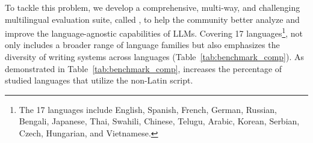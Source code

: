 To tackle this problem, we develop a comprehensive, multi-way, and challenging multilingual evaluation suite, called \name, to help the community better analyze and improve the language-agnostic capabilities of LLMs. 
Covering 17 languages\footnote{The 17 languages include English, Spanish, French, German, Russian, Bengali, Japanese, Thai, Swahili, Chinese, Telugu, Arabic, Korean, Serbian, Czech, Hungarian, and Vietnamese.}, \name not only includes a broader range of language families but also emphasizes the diversity of writing systems across languages (Table~\ref{tab:benchmark_comp}). 
As demonstrated in Table~\ref{tab:benchmark_comp}, \name increases the percentage of studied languages that utilize the non-Latin script.

\begin{table}[t]
    \centering
    \caption{\name provides a more comprehensive analysis of LLM language-agnostic capabilities by covering a broader range of capability scenarios, language families, and script systems. \# LG and \# LG-Family denote the number of supported languages and the language families they belong to, respectively. $R_{\mathrm{non-Latin}}$ refers to the proportion of languages that do not use the Latin script among supported languages. $*$ The results are from P-MMEval. }
    \label{tab:benchmark_comp}
    \vskip 0.1in
    \footnotesize
\end{table}



